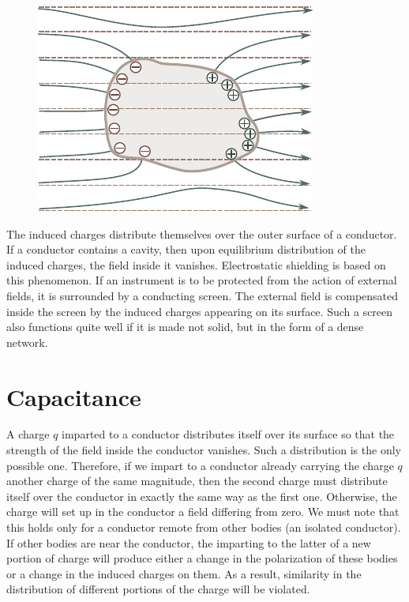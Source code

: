 \begin{figure}[t]
	\begin{center}
		\includegraphics[scale=1]{figures/ch_03/fig_3_4.pdf}
		\caption[]{}
		\label{fig:3_4}
	\end{center}
	\vspace{-0.8cm}
\end{figure}

The induced charges distribute themselves over the outer surface of a conductor. If a conductor contains a cavity, then upon equilibrium distribution of the induced charges, the field inside it vanishes. Electrostatic shielding is based on this phenomenon. If an instrument is to be protected from the action of external fields, it is surrounded by a conducting screen. The external field is compensated inside the screen by the induced charges appearing on its surface. Such a screen also functions quite well if it is made not solid, but in the form of a dense network.

\section{Capacitance}\label{sec:3_3}

A charge $q$ imparted to a conductor distributes itself over its surface so that the strength of the field inside the conductor vanishes. Such a distribution is the only possible one. Therefore, if we impart to a conductor already carrying the charge $q$ another charge of the same magnitude, then the second charge must distribute itself over the conductor in exactly the same way as the first one. Otherwise, the charge will set up in the conductor a field differing from zero. We must note that this holds only for a conductor remote from other bodies (an isolated conductor). If other bodies are near the conductor, the imparting to the latter of a new portion of charge will produce either a change in the polarization of these bodies or a change in the induced charges on them. As a result, similarity in the distribution of different portions of the charge will be violated.

